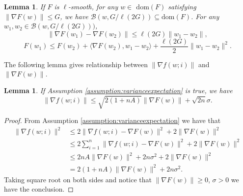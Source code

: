 \documentclass{article} %
\theoremstyle{plain}
\newtheorem{Lemma}[theorem]{Lemma}
\theoremstyle{definition}
\theoremstyle{remark}
\begin{document}


\begin{Lemma}
    \label{Lemma:rlsmooth}
    If $F$ is $\ell$-smooth, for any $w\in$ $\mathrm{dom}(F)$ satisfying $\|\nabla F(w)\|\leq G$, we have $\mathcal{B}(w,G/\ell(2G))\subseteq$$\mathrm{dom}(F)$. For any $w_1, w_2\in \mathcal{B}(w,G/\ell(2G)))$, 
    $$\|\nabla F(w_1)-\nabla F(w_2)\|\leq \ell(2G)\|w_1-w_2\|,$$ 
    $$ F(w_1)\leq F(w_2)+\langle \nabla F(w_2), w_1-w_2\rangle +\frac{\ell(2G)}{2}\|w_1-w_2\|^2.$$
\end{Lemma}

The following lemma gives relationship between $\|\nabla f(w;i)\|$ and $\|\nabla F(w)\|$.

\begin{Lemma}
   \label{Lemma:G'}
   If Assumption \ref{assumption:varianceexpectation} is true, we have 
   $$\|\nabla f(w;i)\|\leq \sqrt{2(1+nA)}\|\nabla F(w)\|+\sqrt{2n}\sigma.$$
\end{Lemma}

\begin{proof}
    From Assumption \ref{assumption:varianceexpectation} we have that 
    \begin{align*}
    \|\nabla f(w;i)\|^2 & \leq 2\|\nabla f(w;i)-\nabla F(w)\|^2+2\|\nabla F(w)\|^2 \\
    & \leq 2\sum_{i=1}^n\|\nabla f(w;i)-\nabla F(w)\|^2+2\|\nabla F(w)\|^2 \\
    & \leq 2nA\|\nabla F(w)\|^2+2n\sigma^2+2\|\nabla F(w)\|^2 \\
    & = 2(1+nA)\|\nabla F(w)\|^2+2n\sigma^2.
    \end{align*}
    Taking square root on both sides and notice that $\|\nabla F(w)\|\geq 0$, $\sigma>0$ we have the conclusion.
\end{proof}
\end{document}
